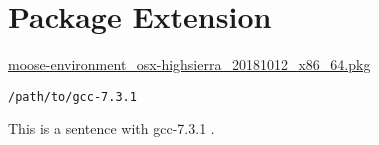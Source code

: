 
\chapter{\label{package-extension}Package Extension}\href{http://www.mooseframework.org/moose\_packages/moose-environment\_osx-highsierra\_20181012\_x86\_64.pkg}{moose-environment\_osx-highsierra\_20181012\_x86\_64.pkg}
\begin{verbatim}/path/to/gcc-7.3.1
\end{verbatim}
\par This is a sentence with gcc-7.3.1 . 